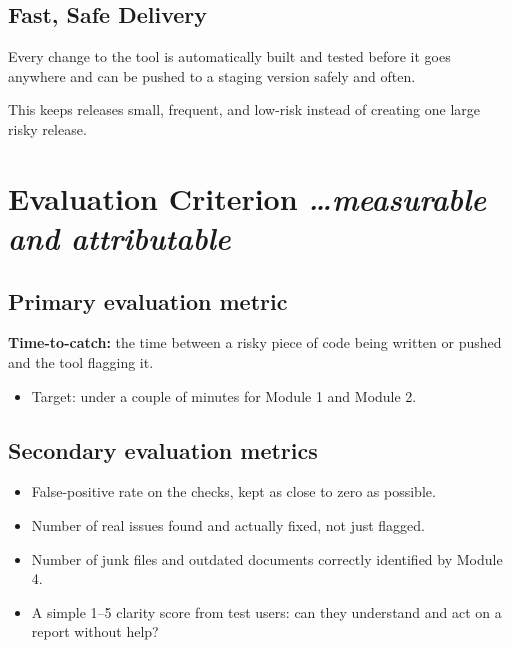 \documentclass[11pt,a4paper]{article}
\newcommand{\BvrHint}[1]{%
  {\normalfont\normalsize\itshape\hfill #1}}
\begin{document}
\subsection{Fast, Safe Delivery}

Every change to the tool is automatically built and tested before it goes anywhere and can be pushed to a staging version safely and often.

This keeps releases small, frequent, and low-risk instead of creating one large risky release.

\section{Evaluation Criterion
  \BvrHint{\ldots measurable and attributable}}

\subsection{Primary evaluation metric}

\textbf{Time-to-catch:} the time between a risky piece of code being written or pushed and the tool flagging it.

\begin{itemize}[leftmargin=0.7cm]

    \item Target: under a couple of minutes for Module 1 and Module 2.

\end{itemize}

\subsection{Secondary evaluation metrics}

\begin{itemize}[leftmargin=0.7cm]

    \item False-positive rate on the checks, kept as close to zero as possible.

    \item Number of real issues found and actually fixed, not just flagged.

    \item Number of junk files and outdated documents correctly identified by Module 4.

    \item A simple 1--5 clarity score from test users: can they understand and act on a report without help?

\end{itemize}
\end{document}

